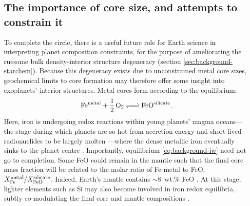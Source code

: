 \subsection{The importance of core size, and attempts to constrain it}
\label{sec:background-redox}

To complete the circle, there is a useful future role for Earth science in interpreting planet composition constraints, for the purpose of ameliorating the ruesome bulk density-interior structure degeneracy (section \ref{sec:background-starchem}). Because this degeneracy exists due to unconstrained metal core sizes, geochemical limits to core formation may therefore offer some insight into exoplanets' interior structures. Metal cores form according to the equilibrium:
\begin{equation}
\label{eq:background-iw}
\ce{Fe^{\rm metal} + \frac{1}{2} O2 <=> FeO^{\rm silicate}}.
\end{equation}
Here, iron is undergoing redox reactions within young planets' magma oceans---the stage during which planets are so hot from accretion energy and short-lived radionuclides to be largely molten \citep{elkins-tanton_magma_2012}---where the dense metallic iron eventually sinks to the planet centre \citep{kleine_rapid_2002, yin_short_2002, wade_core_2005, Wood2006}. Importantly, equilibrium \eqref{eq:background-iw} need not go to completion. Some FeO could remain in the mantle such that the final core mass fraction will be related to the molar ratio of Fe-metal to FeO, $X_{\ce{Fe}}^{\rm metal}/X_{\ce{FeO}}^{\rm silicate}$. Indeed, Earth's mantle contains $\sim$8~wt.\% FeO \citep{mcdonough_composition_1995}. At this stage, lighter elements such as Si may also become involved in iron redox equilibria, subtly co-modulating the final core and mantle compositions \citep{wade_core_2005}.


